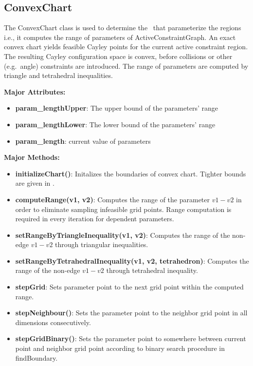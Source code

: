\subsection{ConvexChart} 

The ConvexChart class is used to determine the \chart\ that parameterize the
regions i.e., it computes the range of parameters of ActiveConstraintGraph. An
exact convex chart yields feasible Cayley points for the current active
constraint region. The resulting Cayley configuration space is convex, before
collisions or other (e.g.\ angle) constraints are introduced. The range of
parameters are computed by triangle and tetrahedral inequalities.

\noindent \textbf{Major Attributes:} 
\begin{itemize}
		\item  \textbf{param\_lengthUpper}: The upper bound of the parameters' range 
		\item  \textbf{param\_lengthLower}: The lower bound of the parameters' range 
		\item  \textbf{param\_length}: current value of parameters
\end{itemize}

\noindent \textbf{Major Methods:}
\begin{itemize}
		\item  \textbf{initializeChart()}: Initalizes the boundaries of
				convex chart. Tighter bounds are given in \cite{ugandhar}. 
		\item  \textbf{computeRange(v1, v2)}: Computes the range of the
				parameter $v1-v2$ in order to eliminate sampling infeasible grid
				points. Range computation is required in every iteration for
				dependent parameters. 
		\item  \textbf{setRangeByTriangleInequality(v1, v2)}: Computes the
				range of the non-edge $v1-v2$ through triangular inequalities.
		\item  \textbf{setRangeByTetrahedralInequality(v1, v2, tetrahedron)}:
				Computes the range of the non-edge $v1-v2$ through tetrahedral
				inequality.
		\item  \textbf{stepGrid}: Sets parameter point to the next grid point
				within the computed range.
		\item  \textbf{stepNeighbour()}: Sets the parameter point to the neighbor
				grid point in all dimensions consecutively.
		\item  \textbf{stepGridBinary()}: Sets the parameter point to 
				somewhere between current point and neighbor grid point
				according to binary search procedure in findBoundary.
\end{itemize}


